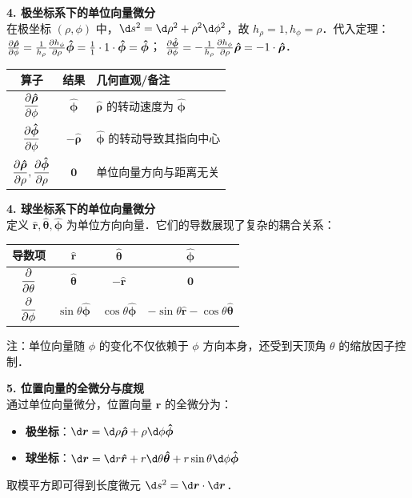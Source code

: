 \documentclass[12pt, a4paper, oneside, UTF8]{ctexbook}
\begin{document}
\noindent \textbf{4. 极坐标系下的单位向量微分} \\
在极坐标 $(\rho, \phi)$ 中，$\d s^2 = \d \rho^2 + \rho^2 \d \phi^2$，故 $h_\rho = 1, h_\phi = \rho$．代入定理：
$\pdv{\bm{\hat{\rho}}}{\phi} = \frac{1}{h_\rho} \pdv{h_\phi}{\rho} \bm{\hat{\phi}} = \frac{1}{1} \cdot 1 \cdot \bm{\hat{\phi}} = \bm{\hat{\phi}}$；
$\pdv{\bm{\hat{\phi}}}{\phi} = -\frac{1}{h_\rho} \pdv{h_\phi}{\rho} \bm{\hat{\rho}} = -1 \cdot \bm{\hat{\rho}}$．
\begin{center}
\renewcommand{\arraystretch}{1.5}
\begin{tabular}{|c|c|l|}
\hline
\textbf{算子} & \textbf{结果} & \textbf{几何直观/备注} \\ \hline
$\displaystyle\pdv{\bm{\hat{\rho}}}{\phi}$ & $\bm{\hat{\phi}}$ & $\bm{\hat{\rho}}$ 的转动速度为 $\bm{\hat{\phi}}$ \\ \hline
$\displaystyle\pdv{\bm{\hat{\phi}}}{\phi}$ & $-\bm{\hat{\rho}}$ & $\bm{\hat{\phi}}$ 的转动导致其指向中心 \\ \hline
$\displaystyle\pdv{\bm{\hat{\rho}}}{\rho}, \pdv{\bm{\hat{\phi}}}{\rho}$ & $\bm{0}$ & 单位向量方向与距离无关 \\ \hline
\end{tabular}
\end{center}

\noindent \textbf{4. 球坐标系下的单位向量微分}\\
定义 $\bm{\hat{r}}, \bm{\hat{\theta}}, \bm{\hat{\phi}}$ 为单位方向向量．它们的导数展现了复杂的耦合关系：
\begin{center}
\renewcommand{\arraystretch}{1.5}
\begin{tabular}{|c||c|c|c|}
\hline
\textbf{导数项} & $\bm{\hat{r}}$ & $\bm{\hat{\theta}}$ & $\bm{\hat{\phi}}$ \\ \hline\hline
$\displaystyle\pdv{}{\theta}$ & $\bm{\hat{\theta}}$ & $-\bm{\hat{r}}$ & $\bm{0}$ \\ \hline
$\displaystyle\pdv{}{\phi}$ & $\sin\theta \bm{\hat{\phi}}$ & $\cos\theta \bm{\hat{\phi}}$ & $-\sin\theta \bm{\hat{r}} - \cos\theta \bm{\hat{\theta}}$ \\ \hline
\end{tabular}
\end{center}
注：单位向量随 $\phi$ 的变化不仅依赖于 $\phi$ 方向本身，还受到天顶角 $\theta$ 的缩放因子控制．

\noindent \textbf{5. 位置向量的全微分与度规}\\
通过单位向量微分，位置向量 $\bm{r}$ 的全微分为：
\begin{itemize}
    \item \textbf{极坐标}：$\d\bm{r} = \d \rho \bm{\hat{\rho}} + \rho \d\phi \bm{\hat{\phi}}$
    \item \textbf{球坐标}：$\d\bm{r} = \d r \bm{\hat{r}} + r \d\theta \bm{\hat{\theta}} + r\sin\theta \d\phi \bm{\hat{\phi}}$
\end{itemize}
取模平方即可得到长度微元 $\d s^2 = \d\bm{r} \cdot \d\bm{r}$．
\end{document}
